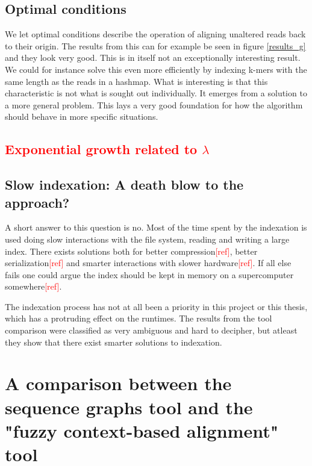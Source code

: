 \documentclass[thesis.tex]{subfiles}
\begin{document}
\subsection*{Optimal conditions}
We let optimal conditions describe the operation of aligning unaltered reads back to their origin. The results from this can for example be seen in figure \ref{results_g} and they look very good. This is in itself not an exceptionally interesting result. We could for instance solve this even more efficiently by indexing k-mers with the same length as the reads in a hashmap. What is interesting is that this characteristic is not what is sought out individually. It emerges from a solution to a more general problem. This lays a very good foundation for how the algorithm should behave in more specific situations. 
\subsection*{\textcolor{red}{Exponential growth related to $\lambda$}}
\subsection*{Slow indexation: A death blow to the approach?}
A short answer to this question is no. Most of the time spent by the indexation is used doing slow interactions with the file system, reading and writing a large index. There exists solutions both for better compression\textcolor{red}{[ref]}, better serialization\textcolor{red}{[ref]} and smarter interactions with slower hardware\textcolor{red}{[ref]}. If all else fails one could argue the index should be kept in memory on a supercomputer somewhere\textcolor{red}{[ref]}.\\
\par\noindent
The indexation process has not at all been a priority in this project or this thesis, which has a protruding effect on the runtimes. The results from the tool comparison were classified as very ambiguous and hard to decipher, but atleast they show that there exist smarter solutions to indexation.
\section{A comparison between the sequence graphs tool and the "fuzzy context-based alignment" tool}
\label{sec:comparison_discussion}
\end{document}
